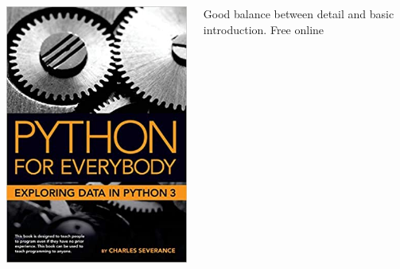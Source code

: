 \documentclass[xcolor=table,aspectratio=169]{beamer}
\begin{document}
{\begin{columns}
    \begin{minipage}[c][0.6\textheight][c]{\linewidth}
        \centering
        \includegraphics[width=0.8\linewidth]{severance_book.jpg}
    \end{minipage}
    \begin{minipage}[c][0.2\textheight][c]{\linewidth}
        \small{Good balance between detail and basic introduction. Free online} 
    \end{minipage}
\end{columns}
}
\end{document}
